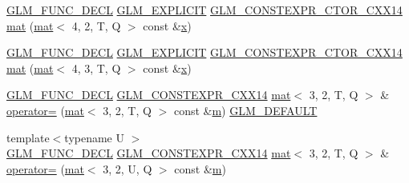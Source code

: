 \begin{DoxyCompactItemize}
\mbox{\hyperlink{setup_8hpp_ab2d052de21a70539923e9bcbf6e83a51}{G\+L\+M\+\_\+\+F\+U\+N\+C\+\_\+\+D\+E\+CL}} \mbox{\hyperlink{setup_8hpp_a6c74f5a5e7b134ab69023ff9a30d4d5d}{G\+L\+M\+\_\+\+E\+X\+P\+L\+I\+C\+IT}} \mbox{\hyperlink{setup_8hpp_a0900f9145e68bf6061b6f5e7be3fa751}{G\+L\+M\+\_\+\+C\+O\+N\+S\+T\+E\+X\+P\+R\+\_\+\+C\+T\+O\+R\+\_\+\+C\+X\+X14}} \mbox{\hyperlink{structglm_1_1mat_3_013_00_012_00_01_t_00_01_q_01_4_aa627625de3446c7169e7b338fbbcec8c}{mat}} (\mbox{\hyperlink{structglm_1_1mat}{mat}}$<$ 4, 2, T, Q $>$ const \&\mbox{\hyperlink{_s_d_l__opengl_8h_ad0e63d0edcdbd3d79554076bf309fd47}{x}})
\item 
\mbox{\hyperlink{setup_8hpp_ab2d052de21a70539923e9bcbf6e83a51}{G\+L\+M\+\_\+\+F\+U\+N\+C\+\_\+\+D\+E\+CL}} \mbox{\hyperlink{setup_8hpp_a6c74f5a5e7b134ab69023ff9a30d4d5d}{G\+L\+M\+\_\+\+E\+X\+P\+L\+I\+C\+IT}} \mbox{\hyperlink{setup_8hpp_a0900f9145e68bf6061b6f5e7be3fa751}{G\+L\+M\+\_\+\+C\+O\+N\+S\+T\+E\+X\+P\+R\+\_\+\+C\+T\+O\+R\+\_\+\+C\+X\+X14}} \mbox{\hyperlink{structglm_1_1mat_3_013_00_012_00_01_t_00_01_q_01_4_a6609dd1388669f460272cae28a7e3f59}{mat}} (\mbox{\hyperlink{structglm_1_1mat}{mat}}$<$ 4, 3, T, Q $>$ const \&\mbox{\hyperlink{_s_d_l__opengl_8h_ad0e63d0edcdbd3d79554076bf309fd47}{x}})
\item 
\mbox{\hyperlink{setup_8hpp_ab2d052de21a70539923e9bcbf6e83a51}{G\+L\+M\+\_\+\+F\+U\+N\+C\+\_\+\+D\+E\+CL}} \mbox{\hyperlink{setup_8hpp_a4dd12abf5e1164bc57f3a34671d03844}{G\+L\+M\+\_\+\+C\+O\+N\+S\+T\+E\+X\+P\+R\+\_\+\+C\+X\+X14}} \mbox{\hyperlink{structglm_1_1mat}{mat}}$<$ 3, 2, T, Q $>$ \& \mbox{\hyperlink{structglm_1_1mat_3_013_00_012_00_01_t_00_01_q_01_4_a2a09bf01e80931b90c2de9504827c84d}{operator=}} (\mbox{\hyperlink{structglm_1_1mat}{mat}}$<$ 3, 2, T, Q $>$ const \&\mbox{\hyperlink{_s_d_l__opengl__glext_8h_af593500c283bf1a787a6f947f503a5c2}{m}}) \mbox{\hyperlink{setup_8hpp_aefce7051c376a64ba89fa93a9f63bc2c}{G\+L\+M\+\_\+\+D\+E\+F\+A\+U\+LT}}
\item 
{\footnotesize template$<$typename U $>$ }\\\mbox{\hyperlink{setup_8hpp_ab2d052de21a70539923e9bcbf6e83a51}{G\+L\+M\+\_\+\+F\+U\+N\+C\+\_\+\+D\+E\+CL}} \mbox{\hyperlink{setup_8hpp_a4dd12abf5e1164bc57f3a34671d03844}{G\+L\+M\+\_\+\+C\+O\+N\+S\+T\+E\+X\+P\+R\+\_\+\+C\+X\+X14}} \mbox{\hyperlink{structglm_1_1mat}{mat}}$<$ 3, 2, T, Q $>$ \& \mbox{\hyperlink{structglm_1_1mat_3_013_00_012_00_01_t_00_01_q_01_4_a3d6d60a4cc35f5c3c0e3b546450cf4b5}{operator=}} (\mbox{\hyperlink{structglm_1_1mat}{mat}}$<$ 3, 2, U, Q $>$ const \&\mbox{\hyperlink{_s_d_l__opengl__glext_8h_af593500c283bf1a787a6f947f503a5c2}{m}})

\end{DoxyCompactItemize}
